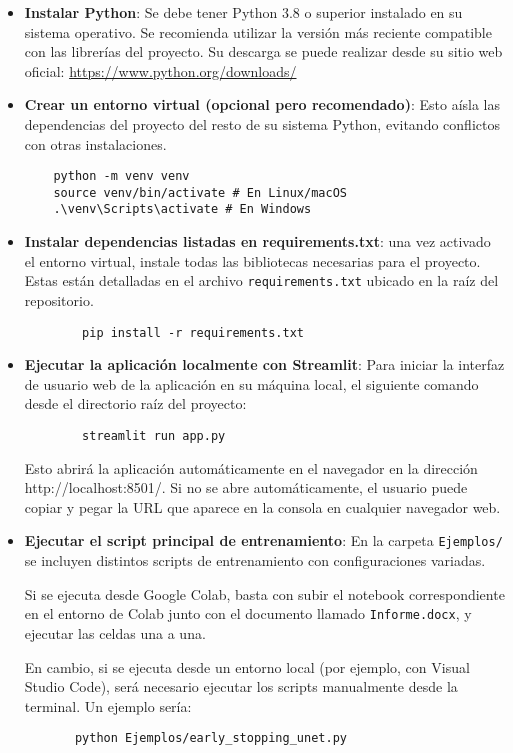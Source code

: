 \begin{itemize}
    \item \textbf{Instalar Python}: Se debe tener Python 3.8 o superior instalado en su sistema operativo. Se recomienda utilizar la versión más reciente compatible con las librerías del proyecto. Su descarga se puede realizar desde su sitio web oficial: \url{https://www.python.org/downloads/}
    \item \textbf{Crear un entorno virtual (opcional pero recomendado)}: Esto aísla las dependencias del proyecto del resto de su sistema Python, evitando conflictos con otras instalaciones.
    \begin{lstlisting}
    python -m venv venv
    source venv/bin/activate # En Linux/macOS
    .\venv\Scripts\activate # En Windows
    \end{lstlisting}
    \item \textbf{Instalar dependencias listadas en requirements.txt}: una vez activado el entorno virtual, instale todas las bibliotecas necesarias para el proyecto. Estas están detalladas en el archivo \texttt{requirements.txt} ubicado en la raíz del repositorio.
    \begin{lstlisting}
        pip install -r requirements.txt
    \end{lstlisting}
    \item \textbf{Ejecutar la aplicación localmente con Streamlit}: Para iniciar la interfaz de usuario web de la aplicación en su máquina local, el siguiente comando desde el directorio raíz del proyecto:
    \begin{lstlisting}
        streamlit run app.py
  \end{lstlisting}
   Esto abrirá la aplicación automáticamente en el navegador en la dirección http://localhost:8501/. Si no se abre automáticamente, el usuario puede copiar y pegar la URL que aparece en la consola en cualquier navegador web.
   \item \textbf{Ejecutar el script principal de entrenamiento}: En la carpeta \texttt{Ejemplos/} se incluyen distintos scripts de entrenamiento con configuraciones variadas. 
   
   Si se ejecuta desde Google Colab, basta con subir el notebook correspondiente en el entorno de Colab junto con el documento llamado \texttt{Informe.docx}, y ejecutar las celdas una a una. 

   En cambio, si se ejecuta desde un entorno local (por ejemplo, con Visual Studio Code), será necesario ejecutar los scripts manualmente desde la terminal. Un ejemplo sería:
   \begin{verbatim}
       python Ejemplos/early_stopping_unet.py
   \end{verbatim}
   

\end{itemize}
